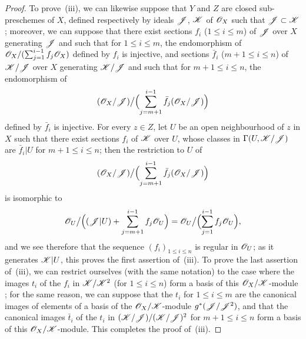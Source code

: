 \begin{proof}
To prove~(iii), we can likewise suppose that $Y$ and $Z$ are closed sub-preschemes of $X$, defined respectively by ideals $\mathscr{J}$, $\mathscr{K}$ of $\mathscr{O}_X$ such that $\mathscr{J}\subset\mathscr{K}$; moreover, we can suppose that there exist sections $f_i$ ($1\leq i\leq m$) of $\mathscr{J}$ over $X$ generating $\mathscr{J}$ and such that for $1\leq i\leq m$, the endomorphism of $\mathscr{O}_X/(\sum_{j=1}^{i-1}f_j\mathscr{O}_X)$ defined by $f_i$ is injective, and sections $\bar{f}_i$ ($m+1\leq i\leq n$) of $\mathscr{K}/\mathscr{J}$ over $X$ generating $\mathscr{K}/\mathscr{J}$ and such that for $m+1\leq i\leq n$, the endomorphism of
\[
  (\mathscr{O}_X/\mathscr{J})\big/\Bigl(\sum_{j=m+1}^{i-1}\bar{f}_j(\mathscr{O}_X/\mathscr{J})\Bigr)
\]
defined by $\bar{f}_i$ is injective.
For every $z\in Z$, let $U$ be an open neighbourhood of $z$ in $X$ such that there exist sections $f_i$ of $\mathscr{K}$ over $U$, whose classes in $\Gamma(U,\mathscr{K}/\mathscr{J})$ are $\bar{f}_i|U$ for $m+1\leq i\leq n$; then the restriction to $U$ of
\[
  (\mathscr{O}_X/\mathscr{J})\big/\Bigl(\sum_{j=m+1}^{i-1}\bar{f}_j(\mathscr{O}_X/\mathscr{J})\Bigr)
\]
is isomorphic to
\[
  \mathscr{O}_U\big/\Bigl((\mathscr{J}|U)+\sum_{j=m+1}^{i-1}f_j\mathscr{O}_U\Bigr)
  =\mathscr{O}_U\big/\Bigl(\sum_{j=1}^{i-1}f_j\mathscr{O}_U\Bigr),
\]
and we see therefore that the sequence $(f_i)_{1\leq i\leq n}$ is regular in $\mathscr{O}_U$; as it generates $\mathscr{K}|U$, this proves the first assertion of~(iii).
To prove the last assertion of~(iii), we can restrict ourselves (with the same notation) to the case where the images $t_i$ of the $f_i$ in $\mathscr{K}/\mathscr{K}^2$ (for $1\leq i\leq n$) form a basis of this $\mathscr{O}_X/\mathscr{K}$-module ; for the same reason, we can suppose that the $t_i$ for $1\leq i\leq m$ are the canonical images of elements of a basis of the $\mathscr{O}_X/\mathscr{K}$-module $g^*(\mathscr{J}/\mathscr{J}^2)$, and that the canonical images $\bar{t}_i$ of the $t_i$ in $(\mathscr{K}/\mathscr{J})/(\mathscr{K}/\mathscr{J})^2$ for $m+1\leq i\leq n$ form a basis of this $\mathscr{O}_X/\mathscr{K}$-module.
This completes the proof of~(iii).


\end{proof}
